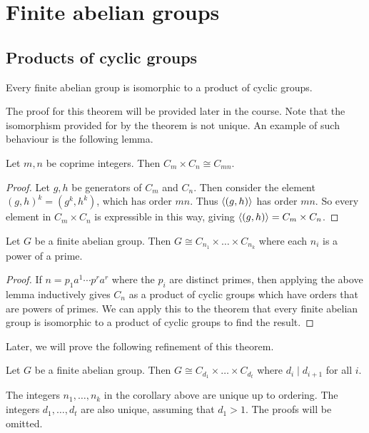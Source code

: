 \section{Finite abelian groups}

\subsection{Products of cyclic groups}
\begin{theorem}
	Every finite abelian group is isomorphic to a product of cyclic groups.
\end{theorem}
The proof for this theorem will be provided later in the course.
Note that the isomorphism provided for by the theorem is not unique.
An example of such behaviour is the following lemma.
\begin{lemma}
	Let $m, n$ be coprime integers.
	Then $C_m \times C_n \cong C_{mn}$.
\end{lemma}
\begin{proof}
	Let $g, h$ be generators of $C_m$ and $C_n$.
	Then consider the element $(g, h)^k = (g^k, h^k)$, which has order $mn$.
	Thus $\left\langle{} (g,h) \right\rangle$ has order $mn$.
	So every element in $C_m \times C_n$ is expressible in this way, giving $\left\langle{} (g,h) \right\rangle = C_m \times C_n$.
\end{proof}
\begin{corollary}
	Let $G$ be a finite abelian group.
	Then $G \cong C_{n_1} \times \dots \times C_{n_k}$ where each $n_i$ is a power of a prime.
\end{corollary}
\begin{proof}
	If $n = p_1 a^1 \cdots p^r a^r$ where the $p_i$ are distinct primes, then applying the above lemma inductively gives $C_n$ as a product of cyclic groups which have orders that are powers of primes.
	We can apply this to the theorem that every finite abelian group is isomorphic to a product of cyclic groups to find the result.
\end{proof}
Later, we will prove the following refinement of this theorem.
\begin{theorem}
	Let $G$ be a finite abelian group.
	Then $G \cong C_{d_1} \times \dots \times C_{d_t}$ where $d_i \mid d_{i+1}$ for all $i$.
\end{theorem}
\begin{remark}
	The integers $n_1, \dots, n_k$ in the corollary above are unique up to ordering.
	The integers $d_1, \dots, d_t$ are also unique, assuming that $d_1 > 1$.
	The proofs will be omitted.
\end{remark}
